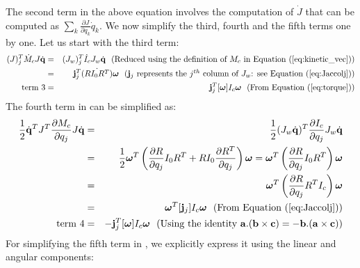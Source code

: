 The second term in the above equation involves the computation of $\dot{J}$ that can be computed as $\sum_k \frac{\partial J}{\partial q_k} \dot{q}_k$. We now simplify the third, fourth and the fifth terms one by one. Let us start with the third term:
\begin{eqnarray}
\label{eq:term3}
\nonumber
(J)_j^T \dot{M}_c J \dot{\vc{q}} & = & (J_w)_j^T \dot{I}_c J_w \dot{\vc{q}} \mbox{\ \ (Reduced using the definition of $M_c$ in \eqnref{kinetic_vec})}\\
\nonumber
& = & \vc{j}_j^T\dot{(RI_0 R^T)}\bm{\omega} \mbox{\ \ ($\vc{j}_j$ represents the $j^{th}$ column of $J_w$: see \eqnref{Jaccolj})} \\
\mbox{term 3} & = & \vc{j}_j^T[\bm{\omega}]I_c \bm{\omega}  \mbox{\ \ (From \eqnref{torque})}
\end{eqnarray}
The fourth term in  can be simplified as:
\begin{eqnarray}
\label{eq:term4}
\nonumber
\frac{1}{2}\dot{\vc{q}}^T J^T \frac{\partial M_c}{\partial q_j} J \dot{\vc{q}} & = & \frac{1}{2} (J_w \dot{\vc{q}})^T \frac{\partial I_c}{\partial q_j} J_w \dot{\vc{q}}\\
\nonumber
& = & \frac{1}{2} \bm{\omega}^T \left ( \frac{\partial R}{\partial q_j}I_0R^T + RI_0\frac{\partial R^T}{\partial q_j} \right )  \bm{\omega} = \bm{\omega}^T \left ( \frac{\partial R}{\partial q_j}I_0R^T \right ) \bm{\omega} \\
\nonumber
& = & \bm{\omega}^T \left ( \frac{\partial R}{\partial q_j}R^T I_c \right ) \bm{\omega}\\
\nonumber
 & = & \bm{\omega}^T [\vc{j}_j] I_c \bm{\omega} \mbox{\ \ (From \eqnref{Jaccolj})}\\
\mbox{term 4}  & = & - \vc{j}_j^T[\bm{\omega}]I_c \bm{\omega} \mbox{\ \ (Using the identity $\vc{a}.(\vc{b}\times\vc{c}) = -\vc{b}.(\vc{a}\times\vc{c}))$}
\end{eqnarray}
For simplifying the fifth term in , we explicitly express it using the linear and angular components:

